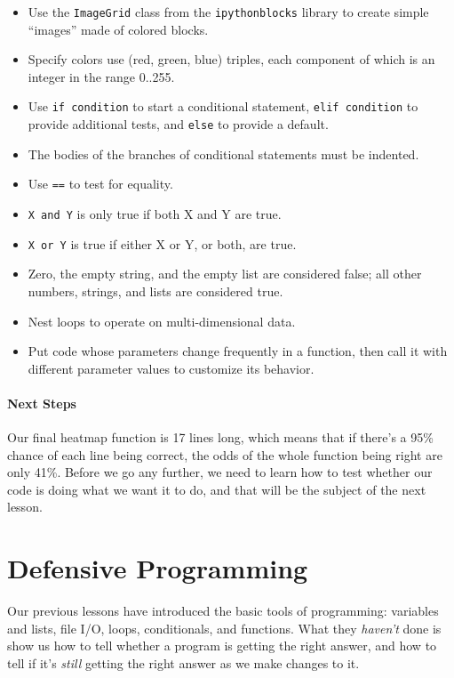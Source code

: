 \documentclass[]{book}
\begin{document}
\begin{itemize}
\item
  Use the \texttt{ImageGrid} class from the \texttt{ipythonblocks}
  library to create simple ``images'' made of colored blocks.
\item
  Specify colors use (red, green, blue) triples, each component of which
  is an integer in the range 0..255.
\item
  Use \texttt{if condition} to start a conditional statement,
  \texttt{elif condition} to provide additional tests, and \texttt{else}
  to provide a default.
\item
  The bodies of the branches of conditional statements must be indented.
\item
  Use \texttt{==} to test for equality.
\item
  \texttt{X and Y} is only true if both X and Y are true.
\item
  \texttt{X or Y} is true if either X or Y, or both, are true.
\item
  Zero, the empty string, and the empty list are considered false; all
  other numbers, strings, and lists are considered true.
\item
  Nest loops to operate on multi-dimensional data.
\item
  Put code whose parameters change frequently in a function, then call
  it with different parameter values to customize its behavior.
\end{itemize}

\mbox{}\paragraph{Next Steps}

Our final heatmap function is 17 lines long, which means that if there's
a 95\% chance of each line being correct, the odds of the whole function
being right are only 41\%. Before we go any further, we need to learn
how to test whether our code is doing what we want it to do, and that
will be the subject of the next lesson.

\section{Defensive Programming}

Our previous lessons have introduced the basic tools of programming:
variables and lists, file I/O, loops, conditionals, and functions. What
they \emph{haven't} done is show us how to tell whether a program is
getting the right answer, and how to tell if it's \emph{still} getting
the right answer as we make changes to it.
\end{document}
